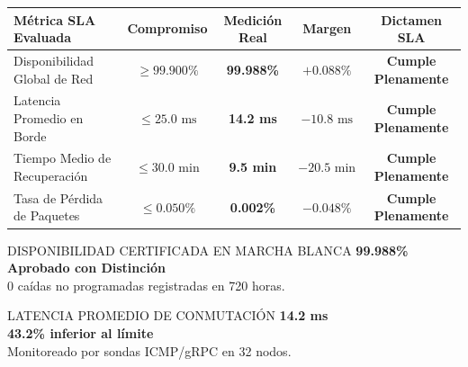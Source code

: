 \documentclass[11pt,letterpaper]{article}
\begin{document}
\vspace{0.4em}

\noindent
\begin{tabularx}{\linewidth}{@{}p{4.2cm} c c c c@{}}
  \toprule
  \textbf{\color{corpPrimary}M\'etrica SLA Evaluada} & \textbf{\color{corpPrimary}Compromiso} & \textbf{\color{corpPrimary}Medici\'on Real} & \textbf{\color{corpPrimary}Margen} & \textbf{\color{corpPrimary}Dictamen SLA} \\
  \midrule
  Disponibilidad Global de Red & $\ge 99.900\%$ & \textbf{99.988\%} & $+0.088\%$ & \textbf{\color{corpSuccess}Cumple Plenamente} \\
  \addlinespace[2pt]
  Latencia Promedio en Borde & $\le 25.0\text{ ms}$ & \textbf{14.2 ms} & $-10.8\text{ ms}$ & \textbf{\color{corpSuccess}Cumple Plenamente} \\
  \addlinespace[2pt]
  Tiempo Medio de Recuperaci\'on & $\le 30.0\text{ min}$ & \textbf{9.5 min} & $-20.5\text{ min}$ & \textbf{\color{corpSuccess}Cumple Plenamente} \\
  \addlinespace[2pt]
  Tasa de P\'erdida de Paquetes & $\le 0.050\%$ & \textbf{0.002\%} & $-0.048\%$ & \textbf{\color{corpSuccess}Cumple Plenamente} \\
  \bottomrule
\end{tabularx}

\vspace{0.6em}

\noindent
\begin{minipage}[t]{0.485\textwidth}
  \begin{corpmetric}{DISPONIBILIDAD CERTIFICADA EN MARCHA BLANCA}
    {\fontsize{18}{20}\selectfont\bfseries\color{corpPrimary} 99.988\%}\\[2pt]
    {\footnotesize\color{corpSuccess}\textbf{Aprobado con Distinci\'on}}\\[1pt]
    {\scriptsize\color{corpTextMuted}0 ca\'idas no programadas registradas en 720 horas.}
  \end{corpmetric}
\end{minipage}\hfill
\begin{minipage}[t]{0.485\textwidth}
  \begin{corpmetric}{LATENCIA PROMEDIO DE CONMUTACI\'ON}
    {\fontsize{18}{20}\selectfont\bfseries\color{corpPrimary} 14.2 ms}\\[2pt]
    {\footnotesize\color{corpSuccess}\textbf{43.2\% inferior al l\'imite}}\\[1pt]
    {\scriptsize\color{corpTextMuted}Monitoreado por sondas ICMP/gRPC en 32 nodos.}
  \end{corpmetric}
\end{minipage}
\end{document}
